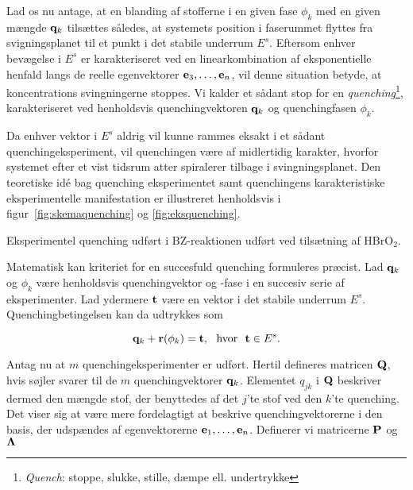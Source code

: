 \vspace{4.0mm}
Lad os nu antage, at en blanding af stofferne i en given
fase $\phi_k$ med en given m{\ae}ngde ${\bf q}_k$
tils{\ae}ttes s{\aa}ledes, at systemets position i
faserummet flyt\-tes fra svigningsplanet til et punkt i det
stabile underrum $E^s$. Eftersom enhver bev{\ae}gelse i
$E^s$ er karakteriseret ved en linearkombination af
eksponentielle henfald langs de reelle egenvektorer ${\bf
e}_3,\ldots,{\bf e}_n$, vil denne situation betyde, at
koncentrations sving\-ningerne stoppes. Vi kalder et
s{\aa}dant stop for en {\em quenching}\footnote{{\em
Quench}: stoppe, slukke, stille, d{\ae}mpe ell.
undertrykke}, karakteriseret ved henholdsvis
quenchingvektoren ${\bf q}_k$ og quenching\-fasen $\phi_k$.

\vspace{4.0mm}
Da enhver vektor i $E^s$ aldrig vil kunne rammes eksakt i
et s{\aa}dant quenchingeks\-peri\-ment, vil quenchingen
v{\ae}re af midlertidig karakter, hvorfor systemet efter et
vist tidsrum atter spiralerer tilbage i sving\-ningsplanet.
Den teoretiske id\'{e} bag quenching eksperimentet samt
quenchingens karakteristiske eksperimentelle manifestation
er illustreret henholdsvis i figur~\ref{fig:skemaquenching}
og \ref{fig:eksquenching}.

{
\caption{\protect\capsize
         Eksperimentel quenching udf{\o}rt i BZ-reaktionen
         udf{\o}rt ved tils{\ae}tning af HBrO$_2$.}
\label{fig:eksquenching}
}

\vspace{4.0mm}
Matematisk kan kriteriet for en succesfuld quenching
formuleres pr{\ae}cist. Lad ${\bf q}_k$ og $\phi_k$
v{\ae}re henholdsvis quenchingvektor og -fase i en succesiv
serie af eksperimenter. Lad ydermere ${\bf t}$ v{\ae}re en
vektor i det stabile underrum $E^s$. Quenchingbetingelsen
kan da udtrykkes som

\begin{equation}
 {\bf q}_k + {\bf r}(\phi_k) = {\bf t},
 \mbox{\ \ hvor\ \ } {\bf t} \in E^s.
 \label{eq:quenchkrit}
\end{equation}

Antag nu at $m$ quenchingeksperimenter er udf{\o}rt. Hertil
defineres matricen ${\bf Q}$, hvis s{\o}jler svarer til de
$m$ quenchingvektorer ${\bf q}_k$. Elementet $q_{jk}$ i
${\bf Q}$ beskriver dermed den m{\ae}ngde stof, der
benyttedes af det $j$'te stof ved den $k$'te quenching. Det
viser sig at v{\ae}re mere fordelagtigt at beskrive
quenchingvektorerne i den basis, der udsp{\ae}ndes af
egenvektorerne ${\bf e}_1,\ldots,{\bf e}_n$. Definerer vi
matricerne ${\bf P}$ og ${\bf \Lambda}$

